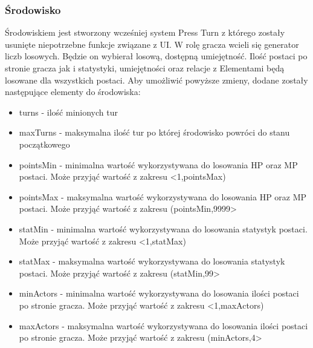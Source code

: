 \documentclass{SGGW-thesis}
\begin{document}
\subsubsection{Środowisko}
Środowiskiem jest stworzony wcześniej system Press Turn z którego zostały usunięte niepotrzebne funkcje związane z UI. W rolę gracza wcieli się generator liczb losowych. Będzie on wybierał losową, dostępną umiejętność.
Ilość postaci po stronie gracza jak i statystyki, umiejętności oraz relacje z Elementami będą losowane dla wszystkich postaci. Aby umożliwić powyższe zmieny, dodane zostały następujące elementy do środowiska:
\begin{itemize}
  \label{randomvals}
  \item{turns - ilość minionych tur}
  \item{maxTurns - maksymalna ilość tur po której środowisko powróci do stanu początkowego}
  \item{pointsMin - minimalna wartość wykorzystywana do losowania HP oraz MP postaci. Może przyjąć wartość z zakresu <1,pointsMax)}
  \item{pointsMax - maksymalna wartość wykorzystywana do losowania HP oraz MP postaci. Może przyjąć wartość z zakresu (pointsMin,9999>}
  \item{statMin - minimalna wartość wykorzystywana do losowania statystyk postaci. Może przyjąć wartość z zakresu <1,statMax)}
  \item{statMax - maksymalna wartość wykorzystywana do losowania statystyk postaci. Może przyjąć wartość z zakresu (statMin,99>}
  \item{minActors - minimalna wartość wykorzystywana do losowania ilości postaci po stronie gracza. Może przyjąć wartość z zakresu <1,maxActors)}
  \item{maxActors - maksymalna wartość wykorzystywana do losowania ilości postaci po stronie gracza. Może przyjąć wartość z zakresu (minActors,4>}
\end{itemize}
\end{document}
